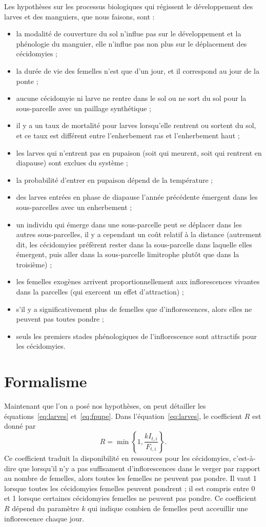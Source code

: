 Les hypothèses sur les processus biologiques qui régissent le développement des larves et des manguiers, que nous faisons, sont :
\begin{itemize}
 \item la modalité de couverture du sol n'influe pas sur le développement et la phénologie du manguier, elle n'influe pas non plus sur le déplacement des cécidomyies ;
 \item la durée de vie des femelles n'est que d'un jour, et il correspond au jour de la ponte ;
 \item aucune cécidomyie ni larve ne rentre dans le sol ou ne sort du sol pour la sous-parcelle avec un paillage synthétique ;
 \item il y a un taux de mortalité pour larves lorsqu'elle rentrent ou sortent du sol, et ce taux est différent entre l'enherbement ras et l'enherbement haut ;
 \item les larves qui n'entrent pas en pupaison (soit qui meurent, soit qui rentrent en diapause) sont exclues du système ;
 \item la probabilité d'entrer en pupaison dépend de la température ;
 \item des larves entrées en phase de diapause l'année précédente émergent dans les sous-parcelles avec un enherbement ;
 \item un individu qui émerge dans une sous-parcelle peut se déplacer dans les autres sous-parcelles, il y a cependant un coût relatif à la distance (autrement dit, les cécidomyies préfèrent rester dans la sous-parcelle dans laquelle elles émergent, puis aller dans la sous-parcelle limitrophe plutôt que dans la troisième) ;
 \item les femelles exogènes arrivent proportionnellement aux inflorescences vivantes dans la parcelles (qui exercent un effet d'attraction) ;
 \item s'il y a significativement plus de femelles que d'inflorescences, alors elles ne peuvent pas toutes pondre ;
 \item  seuls les premiers stades phénologiques de l'inflorescence sont attractifs pour les cécidomyies.
\end{itemize}



\section{Formalisme}

Maintenant que l'on a posé nos hypothèses, on peut détailler les équations~\ref{eq:larves} et~\ref{eq:fpupe}.
Dans l'équation~\ref{eq:larves}, le coefficient $R$ est donné par
\[
R = \min\!\left\{1, \frac{k I_{t, i}}{ F_{t, i}} \right\}\!.
\]
Ce coefficient traduit la disponibilité en ressources pour les cécidomyies, c'est-à-dire que lorsqu'il n'y a pas suffisament d'inflorescences dans le verger par rapport au nombre de femelles, alors toutes les femelles ne peuvent pas pondre.
Il vaut 1 lorsque toutes les cécidomyies femelles peuvent pondrent ; il est compris entre 0 et 1 lorsque certaines cécidomyies femelles ne peuvent pas pondre.
Ce coefficient $R$ dépend du paramètre $k$ qui indique combien de femelles peut acceuillir une inflorescence chaque jour.

